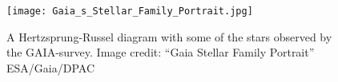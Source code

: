 \begin{figure}
  \centering
  \texttt{[image: Gaia\_s\_Stellar\_Family\_Portrait.jpg]}
  \caption[Hertzsprung-Russel Diagram from Gaia]{\label{img:gaia-stellar-portrait}
    A Hertzsprung-Russel diagram with some of the stars observed by the GAIA-survey.
    Image credit: ``Gaia Stellar Family Portrait'' ESA/Gaia/DPAC
  }
\end{figure}
